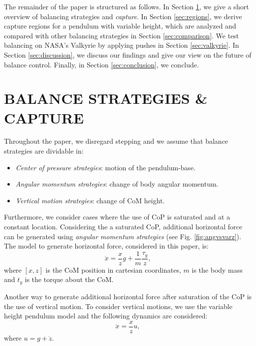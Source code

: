\documentclass[letterpaper, 10 pt, conference]{ieeeconf}  %
\begin{document}
The remainder of the paper is structured as follows. In Section \ref{sec:models}, we give a short overview of balancing strategies  and \textit{capture}. In Section \ref{sec:regions}, we derive capture regions for a pendulum with variable height, which are analyzed and compared with other balancing strategies in Section \ref{sec:comparison}. We test balancing on NASA's Valkyrie by applying pushes in Section \ref{sec:valkyrie}. In Section \ref{sec:discussion}, we discuss our findings and give our view on the future of balance control. Finally, in Section \ref{sec:conclusion}, we conclude.

\section{BALANCE STRATEGIES \& CAPTURE}\label{sec:models}
Throughout the paper, we disregard stepping and we assume that balance strategies are dividable in:
\begin{itemize}
	\item \textit{Center of pressure strategies}: motion of the pendulum-base.
	\item \textit{Angular momentum strategies}: change of body angular momentum.
	\item \textit{Vertical motion strategies}: change of CoM height.
\end{itemize}
Furthermore, we consider cases where the use of CoP is saturated and at a constant location. Considering the a saturated CoP, additional horizontal force can be generated using \textit{angular momentum strategies} (see Fig. \ref{fig:angvsvarz}). The model to generate horizontal force, considered in this paper, is:
\begin{equation}
	\ddot{x} =\frac{x}{z}g + \frac{1}{m}\frac{\tau_y}{z},
\end{equation}
where $[x,z]$ is the CoM position in cartesian coordinates, $m$ is the body mass and $t_y$ is the torque about the CoM.

Another way to generate additional horizontal force after saturation of the CoP is the use of vertical motion. To consider vertical motions, we use the variable height pendulum model and the following dynamics are considered:
\begin{equation}
	\ddot{x} = \frac{x}{z}u,
	\label{eq:height}
\end{equation}
where $u=g+\ddot{z}$.
\end{document}
